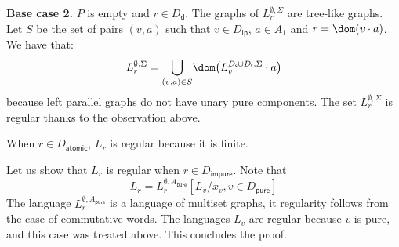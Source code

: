 \noindent \textbf{Base case 2.} $P$ is empty and $r\in D_\mathsf{d}$.  The graphs of $L^{\emptyset,\Sigma}_r$ are tree-like graphs. 
Let $S$ be the set of pairs $(v,a)$ such that $v\in D_{\mathsf{lp}}$, $a\in A_1$ and $r=\dom(v\cdot a)$. We have that:
$$ L^{\emptyset, \Sigma}_r=\underset{(v,a)\in S}{\bigcup}\dom\big({L^{D_\mathsf{s}\cup D_\mathsf{t},\Sigma}_v\cdot a}\big)$$
because left parallel graphs do not have unary pure components. The set $ L^{\emptyset, \Sigma}_r$ is regular thanks to the observation above. 
\medskip

When $r\in D_\mathsf{atomic}$,  $L_r$ is regular because it is finite. 
\medskip

Let us show that $L_r$ is regular when $r\in D_\mathsf{impure}$.
Note that
$$L_r= L^{\emptyset, A_\mathsf{pure}}_r[L_v/x_v, v\in D_\mathsf{pure}]$$
The language $L^{\emptyset, A_\mathsf{pure}}_r$ is a language of multiset graphs, it regularity follows from the case of commutative words. The languages $L_v$ are regular because $v$ is pure, and this case was treated above. This concludes the proof. 